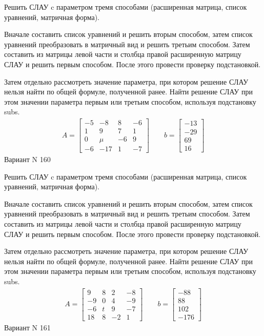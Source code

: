 \documentclass[11pt]{report}
\begin{document}
Решить СЛАУ c параметром тремя способами (расширенная матрица, список уравнений, матричная форма).

Вначале составить список уравнений и решить вторым способом,
затем список уравнений преобразовать в матричный вид и решить третьим способом.
Затем составить из матрицы левой части и столбца правой расширенную матрицу СЛАУ и решить первым способом.
После этого провести проверку подстановкой.

Затем отдельно рассмотреть значение параметра, при котором решение СЛАУ нельзя найти по общей формуле,
полученной ранее.
Найти решение СЛАУ при этом значении параметра первым или третьим способом, используя подстановку subs.
\begin{align*}
    A = \left[\begin{matrix}-5 & -8 & 8 & -6\\1 & 9 & 7 & 1\\0 & \mu & -6 & 9\\-6 & -17 & 1 & -7\end{matrix}\right]
\qquad b = \left[\begin{matrix}-13\\-29\\69\\16\end{matrix}\right]
\end{align*}
\newpage
Вариант N 160


Решить СЛАУ c параметром тремя способами (расширенная матрица, список уравнений, матричная форма).

Вначале составить список уравнений и решить вторым способом,
затем список уравнений преобразовать в матричный вид и решить третьим способом.
Затем составить из матрицы левой части и столбца правой расширенную матрицу СЛАУ и решить первым способом.
После этого провести проверку подстановкой.

Затем отдельно рассмотреть значение параметра, при котором решение СЛАУ нельзя найти по общей формуле,
полученной ранее.
Найти решение СЛАУ при этом значении параметра первым или третьим способом, используя подстановку subs.
\begin{align*}
    A = \left[\begin{matrix}9 & 8 & 2 & -8\\-9 & 0 & 4 & -9\\-6 & t & 9 & -7\\18 & 8 & -2 & 1\end{matrix}\right]
\qquad b = \left[\begin{matrix}-88\\88\\102\\-176\end{matrix}\right]
\end{align*}
\newpage
Вариант N 161
\end{document}
